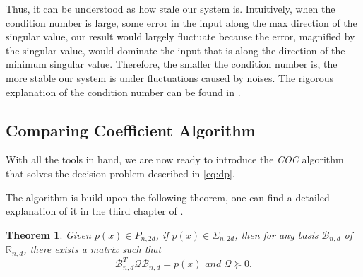 \documentclass[12pt]{amsart}
\numberwithin{equation}{section}
\newtheorem{thm}{Theorem}
\theoremstyle{definition}
\numberwithin{thm}{section}
\begin{document}
Thus, it can be understood as how stale our system is. 
Intuitively, when the condition number is large, some error in the input along the max direction of the singular value,
our result would largely fluctuate because the error, magnified by the singular value, would dominate the input that is along
the direction of the minimum singular value. 
Therefore, the smaller the condition number is, the more stable our system is under fluctuations caused by noises.
The rigorous explanation of the condition number can be found in \cite{Cheney:Kincaid}.

\subsection{Comparing Coefficient Algorithm}
With all the tools in hand, we are now ready to introduce the \emph{COC} algorithm that solves the 
decision problem described in \eqref{eq:dp}.

The algorithm is build upon the following theorem, one can find a detailed explanation of it in the third chapter of \cite{Blekherman:Parrilo:Thomas}.
\begin{thm}
     \label{thm:key}
     Given $p(x) \in P_{n, 2d}$, if $p(x) \in \Sigma_{n, 2d}$, then for any basis $\mathcal{B}_{n, d}$ of $\mathbb{R}_{n, d}$, 
     there exists a matrix such that
     \begin{equation}
          \mathcal{B}_{n, d} ^ T \mathcal{Q} \mathcal{B}_{n, d} = p(x) \textit{ and } \mathcal{Q} \succcurlyeq 0 \label{eq:2-4}.
     \end{equation}
\end{thm}
\end{document}
